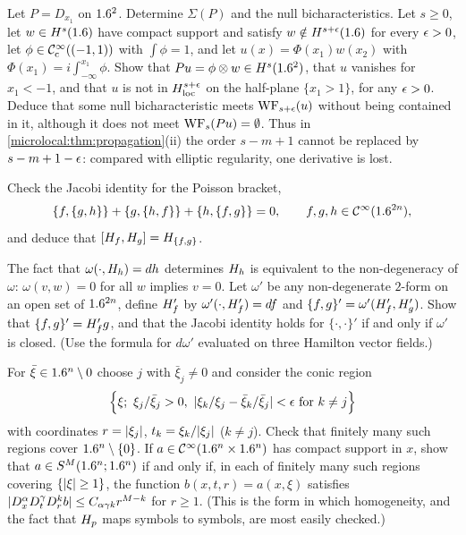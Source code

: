 \begin{exercise}\label{microlocal:ex:Dx1}
  Let $P=D_{x_1}$ on $1.6^2$. Determine $\Sigma(P)$ and the null
  bicharacteristics. Let $s\ge0$, let $w\in H^s(1.6)$ have compact support and
  satisfy $w\notin H^{s+\epsilon}(1.6)$ for every $\epsilon>0$, let $\phi\in\mathcal{C}^\infty_{\mathrm{c}}((-1,1))$ with
  $\int\phi=1$, and let $u(x)=\Phi(x_1)w(x_2)$ with
  $\Phi(x_1)=i\int_{-\infty}^{x_1}\phi$. Show that $Pu=\phi\otimes w\in H^s(1.6^2)$, that
  $u$ vanishes for $x_1<-1$, and that $u$ is not in $H^{s+\epsilon}_{\mathrm{loc}}$ on the
  half-plane $\{x_1>1\}$, for any $\epsilon>0$. Deduce that some null bicharacteristic
  meets $\operatorname{WF}_{s+\epsilon}(u)$ without being contained in it, although it does not
  meet $\operatorname{WF}_s(Pu)=\emptyset$. Thus in \cref{microlocal:thm:propagation}(ii) the
  order $s-m+1$ cannot be replaced by $s-m+1-\epsilon$: compared with elliptic
  regularity, one derivative is lost.
\end{exercise}

\begin{exercise}\label{microlocal:ex:jacobi}
  Check the Jacobi identity for the Poisson bracket,
  \begin{equation*}
    \{f,\{g,h\}\}+\{g,\{h,f\}\}+\{h,\{f,g\}\}=0,\qquad f,g,h\in\mathcal{C}^\infty(1.6^{2n}),
  \end{equation*}
  and deduce that $[H_{f},H_{g}]=H_{\{f,g\}}$.
\end{exercise}

\begin{exercise}\label{microlocal:ex:closed-form}
  The fact that $\omega(\cdot,H_{h})=dh$ determines $H_{h}$ is equivalent to
  the non-degeneracy of $\omega$: $\omega(v,w)=0$ for all $w$ implies $v=0$. Let
  $\omega'$ be any non-degenerate $2$-form on an open set of $1.6^{2n}$, define
  $H_{f}'$ by $\omega'(\cdot,H_{f}')=df$ and $\{f,g\}'=\omega'(H_{f}',H_{g}')$. Show
  that $\{f,g\}'=H_{f}'g$, and that the Jacobi identity holds for $\{\cdot,\cdot\}'$
  if and only if $\omega'$ is closed. (Use the formula for $d\omega'$ evaluated on
  three Hamilton vector fields.)
\end{exercise}

\begin{exercise}\label{microlocal:ex:conic-coordinates}
  For $\bar\xi\in1.6^n\setminus0$ choose $j$ with $\bar\xi_j\ne0$ and consider the
  conic region
  \begin{equation*}
    \Bigl\{\xi;\ \xi_j/\bar\xi_j>0,\ \abs{\xi_k/\xi_j-\bar\xi_k/\bar\xi_j}<\eps\text{ for }k\ne j\Bigr\}
  \end{equation*}
  with coordinates $r=\lvert \xi_j\rvert$, $t_k=\xi_k/\lvert \xi_j\rvert$ ($k\ne j$). Check that
  finitely many such regions cover $1.6^n\setminus\{0\}$. If $a\in\mathcal{C}^\infty(1.6^n\times1.6^n)$ has
  compact support in $x$, show that $a\in S^M(1.6^n;1.6^n)$ if and only if, in each
  of finitely many such regions covering $\{\lvert \xi\rvert\ge1\}$, the function
  $b(x,t,r)=a(x,\xi)$ satisfies
  $\lvert D^\alpha_xD^\gamma_tD^k_rb\rvert\le C_{\alpha\gamma k}r^{M-k}$ for $r\ge1$. (This is the
  form in which homogeneity, and the fact that $H_{p}$ maps symbols to
  symbols, are most easily checked.)
\end{exercise}

